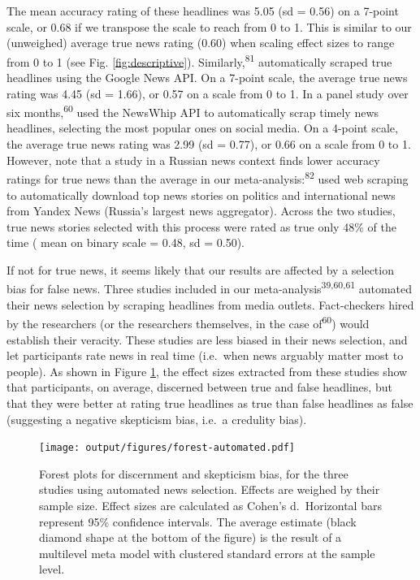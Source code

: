 \documentclass[
  doc,floatsintext]{apa6}
\begin{document}
The mean accuracy rating of these headlines was 5.05 (sd = 0.56) on a 7-point scale, or 0.68 if we transpose the scale to reach from 0 to 1. This is similar to our (unweighed) average true news rating (0.60) when scaling effect sizes to range from 0 to 1 (see Fig. \ref{fig:descriptive}). Similarly,\textsuperscript{81} automatically scraped true headlines using the Google News API. On a 7-point scale, the average true news rating was 4.45 (sd = 1.66), or 0.57 on a scale from 0 to 1. In a panel study over six months,\textsuperscript{60} used the NewsWhip API to automatically scrap timely news headlines, selecting the most popular ones on social media. On a 4-point scale, the average true news rating was 2.99 (sd = 0.77), or 0.66 on a scale from 0 to 1. However, note that a study in a Russian news context finds lower accuracy ratings for true news than the average in our meta-analysis:\textsuperscript{82} used web scraping to automatically download top news stories on politics and international news from Yandex News (Russia's largest news aggregator). Across the two studies, true news stories selected with this process were rated as true only 48\% of the time ( mean on binary scale = 0.48, sd = 0.50).

If not for true news, it seems likely that our results are affected by a selection bias for false news. Three studies included in our meta-analysis\textsuperscript{39,60,61} automated their news selection by scraping headlines from media outlets. Fact-checkers hired by the researchers (or the researchers themselves, in the case of\textsuperscript{60}) would establish their veracity. These studies are less biased in their news selection, and let participants rate news in real time (i.e.~when news arguably matter most to people). As shown in Figure \ref{fig:forest-automated}, the effect sizes extracted from these studies show that participants, on average, discerned between true and false headlines, but that they were better at rating true headlines as true than false headlines as false (suggesting a negative skepticism bias, i.e.~a credulity bias).



\begin{figure}
\centering
\texttt{[image: output/figures/forest-automated.pdf]}
\caption{\label{fig:forest-automated}Forest plots for discernment and skepticism bias, for the three studies using automated news selection. Effects are weighed by their sample size. Effect sizes are calculated as Cohen's d.~Horizontal bars represent 95\% confidence intervals. The average estimate (black diamond shape at the bottom of the figure) is the result of a multilevel meta model with clustered standard errors at the sample level.}
\end{figure}
\end{document}
